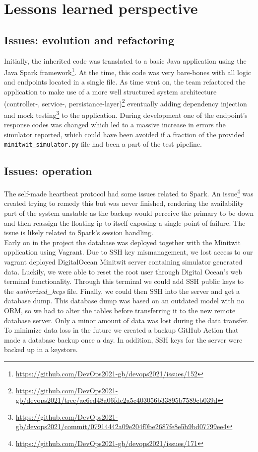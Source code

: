 \section{Lessons learned perspective} \label{section:Lessons learned perspective}
\subsection{Issues: evolution and refactoring}
Initially, the inherited code was translated to a basic Java application using the Java Spark framework\footnote{\url{https://github.com/DevOps2021-gb/devops2021/issues/152}}. At the time, this code was very bare-bones with all logic and endpoints located in a single file. As time went on, the team refactored the application to make use of a more well structured system architecture (controller-, service-, persistance-layer)\footnote{\url{https://github.com/DevOps2021-gb/devops2021/tree/ae6cd48a06fde2a5c403056b33895b7589cb039d}} eventually adding dependency injection and mock testing\footnote{\url{https://github.com/DevOps2021-gb/devops2021/commit/07914442a09e204f0be2687fe8e5b9bd07799ee4}} to the application. 
During development one of the endpoint's response codes was changed which led to a massive increase in errors the simulator reported, which could have been avoided if a fraction of the provided \texttt{minitwit\_simulator.py} file had been a part of the test pipeline.

\subsection{Issues: operation}
\label{issues-operation}
The self-made heartbeat protocol had some issues related to Spark. An issue\footnote{\url{https://github.com/DevOps2021-gb/devops2021/issues/171}} was created trying to remedy this but was never finished, rendering the availability part of the system unstable as the backup would perceive the primary to be down and then reassign the floating-ip to itself exposing a single point of failure. The issue is likely related to Spark's session handling.\\

Early on in the project the database was deployed together with the Minitwit application using Vagrant. Due to SSH key mismanagement, we lost access to our vagrant deployed DigitalOcean Minitwit server containing simulator generated data. Luckily, we were able to reset the root user through Digital Ocean's web terminal functionality. Through this terminal we could add SSH public keys to the \textit{authorized\_keys} file. Finally, we could then SSH into the server and get a database dump. This database dump was based on an outdated model with no ORM, so we had to alter the tables before transferring it to the new remote database server. Only a minor amount of data was lost during the data transfer. To minimize data loss in the future we created a backup GitHub Action that made a database backup once a day. In addition, SSH keys for the server were backed up in a keystore.

